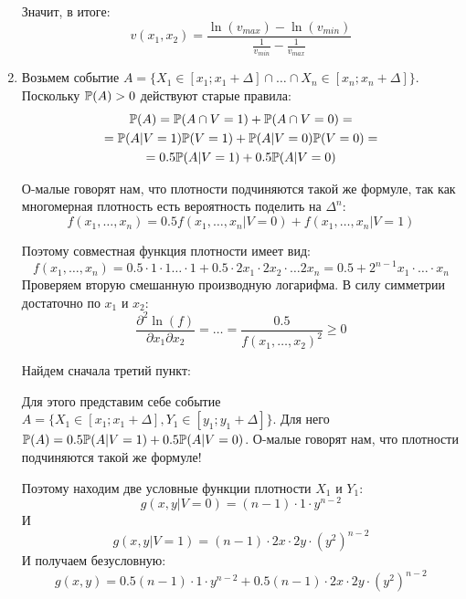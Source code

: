 \begin{enumerate}
Значит, в итоге:
\begin{equation}
v(x_{1},x_{2})=\frac{\ln(v_{max})-\ln(v_{min})}{\frac{1}{v_{min}}-\frac{1}{v_{max}}}
\end{equation}

\item Возьмем событие $ A=\{X_{1}\in[x_{1};x_{1}+\Delta] \cap \ldots \cap X_{n}\in[x_{n};x_{n}+\Delta]\} $. Поскольку $ \P(A)>0 $ действуют старые правила:
\begin{multline}
\P(A)=\P(A\cap V=1)+\P(A\cap V=0)=\\
=\P(A|V=1)\P(V=1)+\P(A|V=0)\P(V=0)=\\
=0.5\P(A|V=1)+0.5\P(A|V=0)
\end{multline}

О-малые говорят нам, что плотности подчиняются такой же формуле, так как многомерная плотность есть вероятность поделить на $ \Delta^{n} $:
\begin{equation}
f(x_{1},\ldots,x_{n})=0.5f(x_{1},\ldots,x_{n}|V=0)+f(x_{1},\ldots,x_{n}|V=1)
\end{equation}

Поэтому совместная функция плотности имеет вид:
\begin{equation}
f(x_{1},\ldots,x_{n})=0.5\cdot 1\cdot 1 \ldots\cdot 1+0.5\cdot 2x_{1}\cdot 2x_{2}\cdot \ldots 2x_{n}=0.5+2^{n-1}x_{1}\cdot \ldots \cdot x_{n}
\end{equation}
Проверяем вторую смешанную производную логарифма. В силу симметрии достаточно по $ x_{1} $ и $ x_{2} $:
\begin{equation}
\frac{\partial^{2}\ln(f)}{\partial x_{1}\partial x_{2}}=\ldots=\frac{0.5}{f(x_{1},\ldots,x_{2})^{2}}\geq 0
\end{equation}


Найдем сначала третий пункт:

Для этого представим себе событие $ A=\{X_{1}\in [x_{1};x_{1}+\Delta], Y_{1}\in[y_{1};y_{1}+\Delta]\} $. Для него $ \P(A)= 0.5\P(A|V=1)+0.5\P(A|V=0)$. О-малые говорят нам, что плотности подчиняются такой же формуле!

Поэтому находим две условные функции плотности $ X_{1} $ и $ Y_{1} $:
\begin{equation}
g(x,y|V=0)=(n-1)\cdot 1 \cdot y^{n-2}
\end{equation}
И
\begin{equation}
g(x,y|V=1)=(n-1)\cdot 2x \cdot 2y \cdot (y^{2})^{n-2}
\end{equation}
И получаем безусловную:
\begin{equation}
g(x,y)=0.5(n-1)\cdot 1 \cdot y^{n-2}+0.5(n-1)\cdot 2x \cdot 2y \cdot (y^{2})^{n-2}
\end{equation}


\end{enumerate}
